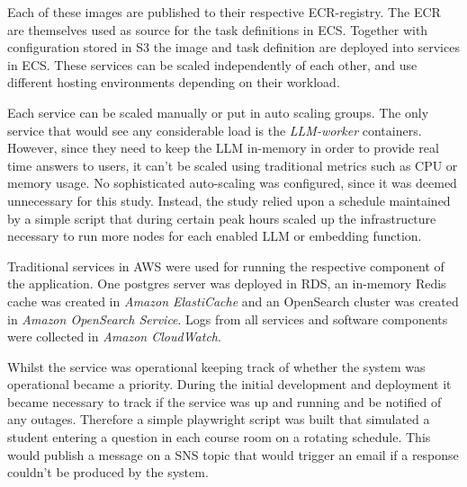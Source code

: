 Each of these images are published to their respective \gls{ECR}-registry. The \gls{ECR} are themselves used as source for the task definitions in \gls{ECS}. Together with configuration stored in \gls{S3} the image and task definition are deployed into services in \gls{ECS}. These services can be scaled independently of each other, and use different hosting environments depending on their workload.


Each service can be scaled manually or put in auto scaling groups. The only service that would see any considerable load is the \textit{LLM-worker} containers. However, since they need to keep the \gls{LLM} in-memory in order to provide real time answers to users, it can’t be scaled using traditional metrics such as CPU or memory usage. No sophisticated auto-scaling was configured, since it was deemed unnecessary for this study. Instead, the study relied upon a schedule maintained by a simple script that during certain peak hours scaled up the infrastructure necessary to run more nodes for each enabled \gls{LLM} or embedding function.


Traditional services in AWS were used for running the respective component of the application. One postgres server was deployed in \gls{RDS}, an in-memory Redis cache was created in \textit{Amazon ElastiCache} and an OpenSearch cluster was created in \textit{Amazon OpenSearch Service}. Logs from all services and software components were collected in \textit{Amazon CloudWatch}.


Whilst the service was operational keeping track of whether the system was operational became a priority. During the initial development and deployment it became necessary to track if the service was up and running and be notified of any outages. Therefore a simple playwright script was built that simulated a student entering a question in each course room on a rotating schedule. This would publish a message on a \gls{SNS} topic that would trigger an email if a response couldn’t be produced by the system.










